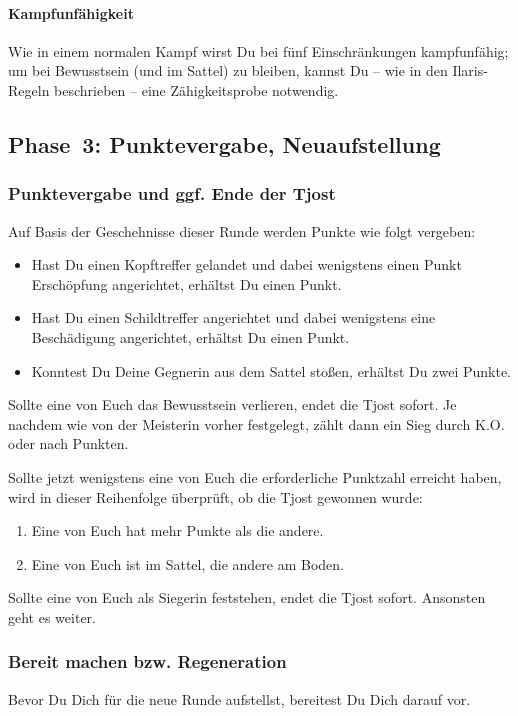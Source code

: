 \documentclass[12pt,div=calc,a5paper,parskip=half]{scrartcl}
\begin{document}
\paragraph{Kampfunfähigkeit} Wie in einem normalen Kampf wirst Du bei fünf Einschränkungen kampfunfähig; um bei Bewusstsein (und im Sattel) zu bleiben, kannst Du -- wie in den Ilaris-Regeln beschrieben -- eine Zähigkeitsprobe notwendig. 

\subsection{Phase~3: Punktevergabe, Neuaufstellung}

\subsubsection{Punktevergabe und ggf. Ende der Tjost}
Auf Basis der Geschehnisse dieser Runde werden Punkte wie folgt vergeben:
\begin{itemize}
    \item Hast Du einen Kopftreffer gelandet und dabei wenigstens einen Punkt Erschöpfung angerichtet, erhältst Du einen Punkt. 
    \item Hast Du einen Schildtreffer angerichtet und dabei wenigstens eine Beschädigung angerichtet, erhältst Du einen Punkt.
    \item Konntest Du Deine Gegnerin aus dem Sattel stoßen, erhältst Du zwei Punkte.  
\end{itemize}
Sollte eine von Euch das Bewusstsein verlieren, endet die Tjost sofort. Je nachdem wie von der Meisterin vorher festgelegt, zählt dann ein Sieg durch K.O. oder nach Punkten. 

Sollte jetzt wenigstens eine von Euch die erforderliche Punktzahl erreicht haben, wird in dieser Reihenfolge überprüft, ob die Tjost gewonnen wurde: 
\begin{enumerate}
    \item Eine von Euch hat mehr Punkte als die andere.
    \item Eine von Euch ist im Sattel, die andere am Boden.
\end{enumerate}
Sollte eine von Euch als Siegerin feststehen, endet die Tjost sofort. Ansonsten geht es weiter.

\subsubsection{Bereit machen bzw. Regeneration}
Bevor Du Dich für die neue Runde aufstellst, bereitest Du Dich darauf vor. 
\end{document}
